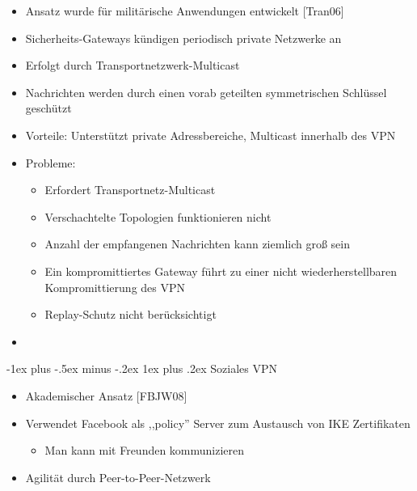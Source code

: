 \documentclass[a4paper]{article}
\makeatletter
\renewcommand{\subsubsection}{\@startsection{subsubsection}{3}{0mm}%
 {-1ex plus -.5ex minus -.2ex}%
 {1ex plus .2ex}%
 {\normalfont\small\bfseries}}
\makeatother
\begin{document}
\begin{multicols}{3}
    \begin{itemize}
        \item
              Ansatz wurde für militärische Anwendungen entwickelt {[}Tran06{]}
        \item
              Sicherheits-Gateways kündigen periodisch private Netzwerke an
        \item
              Erfolgt durch Transportnetzwerk-Multicast
        \item
              Nachrichten werden durch einen vorab geteilten symmetrischen Schlüssel
              geschützt
        \item
              Vorteile: Unterstützt private Adressbereiche, Multicast innerhalb des
              VPN
        \item
              Probleme:

              \begin{itemize}
                  \item
                        Erfordert Transportnetz-Multicast
                  \item
                        Verschachtelte Topologien funktionieren nicht
                  \item
                        Anzahl der empfangenen Nachrichten kann ziemlich groß sein
                  \item
                        Ein kompromittiertes Gateway führt zu einer nicht
                        wiederherstellbaren Kompromittierung des VPN
                  \item
                        Replay-Schutz nicht berücksichtigt
              \end{itemize}
        \item
    \end{itemize}


    \subsubsection{Soziales VPN}

    \begin{itemize}
        \item
              Akademischer Ansatz {[}FBJW08{]}
        \item
              Verwendet Facebook als ,,policy'' Server zum Austausch von IKE
              Zertifikaten

              \begin{itemize}
                  \item
                        Man kann mit Freunden kommunizieren
              \end{itemize}
        \item
              Agilität durch Peer-to-Peer-Netzwerk


\end{itemize}
\end{multicols}
\end{document}
